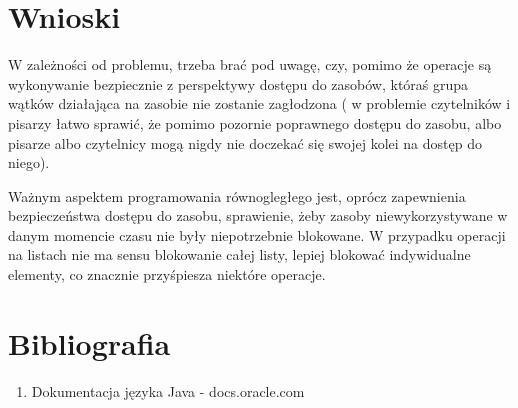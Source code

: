 \documentclass{article}
\begin{document}
\section{Wnioski}

W zależności od problemu, trzeba brać pod uwagę, czy, pomimo że operacje są wykonywanie bezpiecznie z
perspektywy dostępu do zasobów, któraś grupa wątków działająca na zasobie nie zostanie zagłodzona (
w problemie czytelników i pisarzy łatwo sprawić, że pomimo pozornie poprawnego dostępu do zasobu,
albo pisarze albo czytelnicy mogą nigdy nie doczekać się swojej kolei na dostęp do niego).

Ważnym aspektem programowania równogległego jest, oprócz zapewnienia bezpieczeństwa dostępu do zasobu,
sprawienie, żeby zasoby niewykorzystywane w danym momencie czasu nie były niepotrzebnie blokowane.
W przypadku operacji na listach nie ma sensu blokowanie całej listy, lepiej blokować indywidualne elementy,
co znacznie przyśpiesza niektóre operacje.

\section{Bibliografia}

\begin{enumerate}
    \item 
    Dokumentacja języka Java - docs.oracle.com
\end{enumerate}
\end{document}
